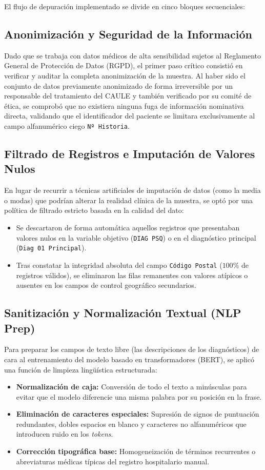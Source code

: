 \documentclass[12pt,a4paper,onecolumn,oneside]{report}
\begin{document}
El flujo de depuración implementado se divide en cinco bloques secuenciales:

\subsection{Anonimización y Seguridad de la Información}
Dado que se trabaja con datos médicos de alta sensibilidad sujetos al Reglamento General de Protección de Datos (RGPD), el primer paso crítico consistió en verificar y auditar la completa anonimización de la muestra. Al haber sido el conjunto de datos previamente anonimizado de forma irreversible por un responsable del tratamiento del CAULE y también verificado por su comité de ética, se comprobó que no existiera ninguna fuga de información nominativa directa, validando que el identificador del paciente se limitara exclusivamente al campo alfanumérico ciego \texttt{Nº Historia}.

\subsection{Filtrado de Registros e Imputación de Valores Nulos}
En lugar de recurrir a técnicas artificiales de imputación de datos (como la media o modas) que podrían alterar la realidad clínica de la muestra, se optó por una política de filtrado estricto basada en la calidad del dato:
\begin{itemize}
    \item Se descartaron de forma automática aquellos registros que presentaban valores nulos en la variable objetivo (\texttt{DIAG PSQ}) o en el diagnóstico principal (\texttt{Diag 01 Principal}).
    \item Tras constatar la integridad absoluta del campo \texttt{Código Postal} ($100\%$ de registros válidos), se eliminaron las filas remanentes con valores atípicos o ausentes en los campos de control geográfico secundarios.
\end{itemize}

\subsection{Sanitización y Normalización Textual (NLP Prep)}
Para preparar los campos de texto libre (las descripciones de los diagnósticos) de cara al entrenamiento del modelo basado en transformadores (BERT), se aplicó una función de limpieza lingüística estructurada:
\begin{itemize}
    \item \textbf{Normalización de caja:} Conversión de todo el texto a minúsculas para evitar que el modelo diferencie una misma palabra por su posición en la frase.
    \item \textbf{Eliminación de caracteres especiales:} Supresión de signos de puntuación redundantes, dobles espacios en blanco y caracteres no alfanuméricos que introducen ruido en los \textit{tokens}.
    \item \textbf{Corrección tipográfica base:} Homogeneización de términos recurrentes o abreviaturas médicas típicas del registro hospitalario manual.
\end{itemize}
\end{document}
